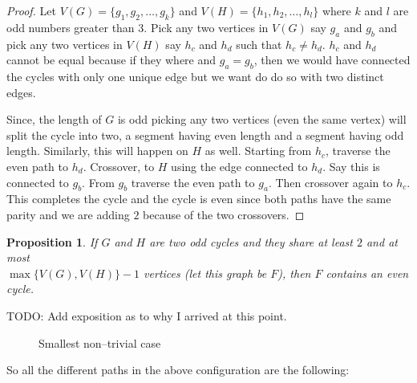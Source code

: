 \documentclass[12pt]{article}
\theoremstyle{plain}
\newtheorem{prop}{Proposition}
\begin{document}
\begin{proof}
    Let $V(G) = \{g_1, g_2, \ldots, g_k\}$ and $V(H) = \{h_1,
    h_2, \ldots, h_l\}$ where $k$ and $l$ are odd numbers
    greater than $3$. Pick any two vertices in $V(G)$ say $g_a$
    and $g_b$ and pick any two vertices in $V(H)$ say $h_c$ and
    $h_d$ such that $h_c \not = h_d$. $h_c$ and $h_d$ cannot be
    equal because if they where and $g_a = g_b$, then we would
    have connected the cycles with only one unique edge but we
    want do do so with two distinct edges.

    Since, the length of $G$ is odd picking any two vertices
    (even the same vertex) will split the cycle into two, a
    segment having even length and a segment having odd length.
    Similarly, this will happen on $H$ as well. Starting from
    $h_c$, traverse the even path to $h_d$. Crossover, to $H$
    using the edge connected to $h_d$. Say this is connected to
    $g_b$. From $g_b$ traverse the even path to $g_a$. Then
    crossover again to $h_c$. This completes the cycle and the
    cycle is even since both paths have the same parity and we
    are adding $2$ because of the two crossovers.
\end{proof}

\begin{prop}
If $G$ and $H$ are two odd cycles and they share at least $2$ and at most \\ $\max\{V(G), V(H)\} - 1$ vertices (let
this graph be $F$), then $F$ contains an even cycle. 
\end{prop}

TODO: Add exposition as to why I arrived at this point.

\begin{figure}[H]
\centering
{}
\caption{Smallest non--trivial case}
\end{figure}

So all the different paths in the above configuration are the
following:
\end{document}
